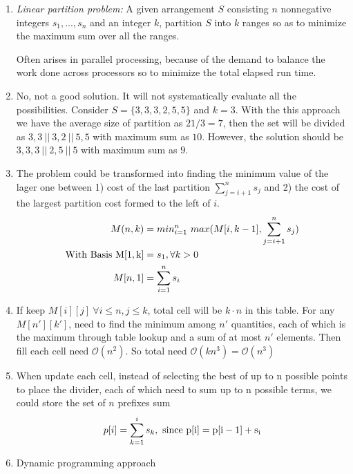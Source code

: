 \documentclass{assignment}
\begin{document}
    \maketitle

    \newpage

	
	\begin{homeworkProblem}
	\begin{enumerate}
	\item \textit{Linear partition problem:} A given arrangement $S$ consisting $n$ nonnegative integers ${s_1, ...,s_n}$ and an integer $k$, partition $S$ into $k$ ranges so as to minimize the maximum sum over all the ranges. 
	
	Often arises in parallel processing, because of the demand to balance the work done across processors so to minimize the total elapsed run time.
	\item No, not a good solution. It will not systematically evaluate all the possibilities. Consider $S=\{3, 3, 3, 2, 5, 5\} $ and $k=3$. With the this approach we have the average size of partition as $21/3=7$, then the set will be divided as $3, 3\ ||\  3, 2\ ||\ 5, 5$ with maximum sum as $10$. However, the solution should be  $3,3,3\ ||\ 2,5\ ||\ 5$ with maximum sum as $9$. 
	\item 
	The problem could be transformed into finding the minimum value of the lager one between 1) cost of the last partition $ \sum_{j=i+1}^n s_j $ and 2) the cost of the largest partition cost formed to the left of $i$. 
	\begin{align*}
M(n, k) &= min_{i=1}^n \ max(M[i, k-1], \sum_{j=i+1}^n s_j) \\
\rm{With\ Basis}\ M[1,k] &= s_1, \forall k>0 \\
M[n,1] &= \sum_{i=1}^ns_i	
	\end{align*}
	\item 
	If keep $M[i][j] \ \forall i\leq n, j\leq k$, total cell will be $k \cdot n$ in this table. 
	For any $M[n'][k']$, need to find the minimum among $n'$ quantities, each of which is the maximum through table lookup and a sum of at most $n'$ elements. Then fill each cell need $\mathcal{O}(n^2)$. So total need $\mathcal{O}(kn^3) = \mathcal{O}(n^3)$
	\item When update  each cell, instead of selecting the best of up to n possible points to place the divider, each of which need to sum up to n possible terms, we could store the set of $n$ prefixes sum 
	$$p[i]=\sum_{k=1}^is_k,\ \rm{since}\ p[i] = p[i-1] + s_i$$
	\item  Dynamic programming approach 
	

\end{enumerate}
\end{homeworkProblem}
\end{document}
